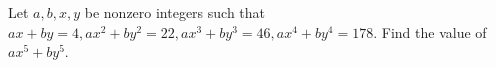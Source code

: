 Let $a, b, x, y$ be nonzero integers such that $ax+by=4, ax^{2}+by^{2}=22, ax^{3}+by^{3}=46, ax^{4}+by^{4}=178$. Find the value of $ax^{5}+by^{5}$.
